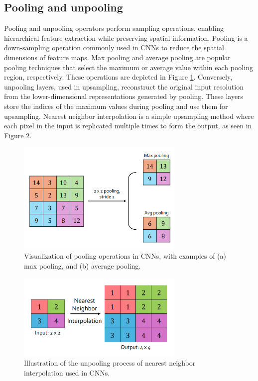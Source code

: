 \subsection{Pooling and unpooling} Pooling and unpooling operators perform sampling operations, enabling hierarchical feature extraction while preserving spatial information. Pooling is a down-sampling operation commonly used in CNNs to reduce the spatial dimensions of feature maps. Max pooling and average pooling are popular pooling techniques that select the maximum or average value within each pooling region, respectively. These operations are depicted in Figure \ref{fig:Pool}. Conversely, unpooling layers, used in upsampling, reconstruct the original input resolution from the lower-dimensional representations generated by pooling. These layers store the indices of the maximum values during pooling and use them for upsampling. Nearest neighbor interpolation is a simple upsampling method where each pixel in the input is replicated multiple times to form the output, as seen in Figure \ref{fig:Unpool2}.
\begin{figure}[ht]
    \centering
    \includegraphics[width=8cm]{images/Theory-DL/Pool.png}
    \caption{Visualization of pooling operations in CNNs, with examples of (a) max pooling, and (b) average pooling.}
    \label{fig:Pool}
\end{figure}
\begin{figure}[ht]
        \centering
        \includegraphics[width=8cm]{images/Theory-DL/NNUnpool.png}
        \caption{Illustration of the unpooling process of nearest neighbor interpolation used in CNNs.}
        \label{fig:Unpool2}
    \end{figure}
